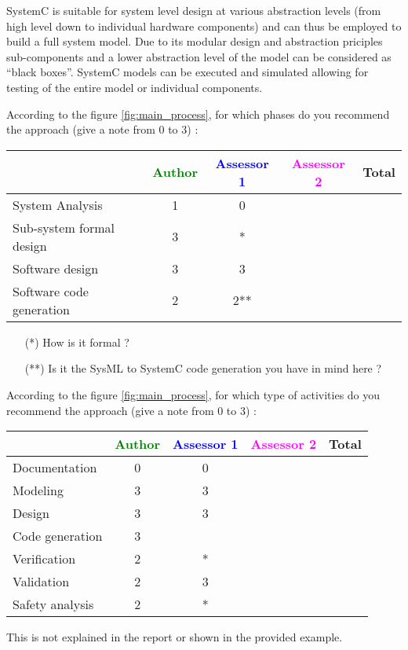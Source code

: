 SystemC is suitable for system level design at various abstraction levels (from high level down to individual hardware components) and can thus be employed to build a full system model. Due to its modular design and abstraction priciples sub-components and a lower abstraction level of the model can be considered as ``black boxes''. SystemC models can be executed and simulated allowing for testing of the entire model or individual components.

According to the figure \ref{fig:main_process}, for which phases do you recommend the approach (give a note from 0 to 3) :

\begin{tabular}{|l | c | c | c | c|}
\hline
& \textcolor{green}{Author} & \textcolor{blue}{Assessor 1} & \textcolor{magenta}{Assessor 2} & Total \\
\hline
System Analysis &1 & 0 & & \\
\hline
Sub-system formal design & 3 & *  & & \\
\hline
Software design &3 &3 & & \\
\hline
Software code generation &2 & 2** & & \\
\hline
\end{tabular}
\begin{assessor1}
\begin{itemize}
\item[(*)] How is it formal ?
\item[(**)] Is it the SysML to  SystemC code generation  you have in
  mind here ?
\end{itemize}
\end{assessor1}

According to the figure \ref{fig:main_process}, for which type of activities do you recommend the approach (give a note from 0 to 3) :

\begin{tabular}{|l | c | c | c | c|}
\hline
& \textcolor{green}{Author} & \textcolor{blue}{Assessor 1} & \textcolor{magenta}{Assessor 2} & Total \\
\hline
Documentation &0 & 0 & & \\
\hline
Modeling &3 & 3 & & \\
\hline
Design &3 &3 & & \\
\hline
Code generation &3 &  & & \\
\hline
Verification &2 &* & & \\
\hline
Validation &2 &3 & & \\
\hline
Safety analysis &2 &* & & \\
\hline
\end{tabular}
\begin{assessor1}
This is not explained in the report or shown in  the provided example.
\end{assessor1}


